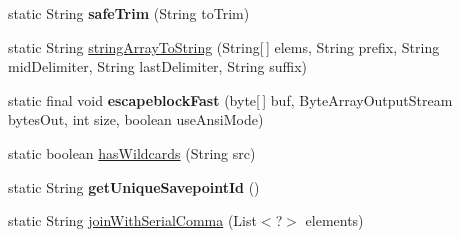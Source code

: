 \begin{DoxyCompactItemize}
\item 
\mbox{\label{classcom_1_1mysql_1_1cj_1_1util_1_1_string_utils_a5396da0d2136d1d4c29ac524fb3c4a95}} 
static String {\bfseries safe\+Trim} (String to\+Trim)
\item 
static String \mbox{\hyperlink{classcom_1_1mysql_1_1cj_1_1util_1_1_string_utils_affd9db31d705e4eb839d18f08564459a}{string\+Array\+To\+String}} (String\mbox{[}$\,$\mbox{]} elems, String prefix, String mid\+Delimiter, String last\+Delimiter, String suffix)
\item 
\mbox{\label{classcom_1_1mysql_1_1cj_1_1util_1_1_string_utils_ad76be718917db8d91c0f77e545fb4651}} 
static final void {\bfseries escapeblock\+Fast} (byte\mbox{[}$\,$\mbox{]} buf, Byte\+Array\+Output\+Stream bytes\+Out, int size, boolean use\+Ansi\+Mode)
\item 
static boolean \mbox{\hyperlink{classcom_1_1mysql_1_1cj_1_1util_1_1_string_utils_a204a2c01c54e82d727be35f18bfeaffe}{has\+Wildcards}} (String src)
\item 
\mbox{\label{classcom_1_1mysql_1_1cj_1_1util_1_1_string_utils_ab44e0f6cf8aa3f48cd7a0ea0ed9ced2d}} 
static String {\bfseries get\+Unique\+Savepoint\+Id} ()
\item 
static String \mbox{\hyperlink{classcom_1_1mysql_1_1cj_1_1util_1_1_string_utils_afa316f29440d108b71338a160eeb4868}{join\+With\+Serial\+Comma}} (List$<$?$>$ elements)
\end{DoxyCompactItemize}
